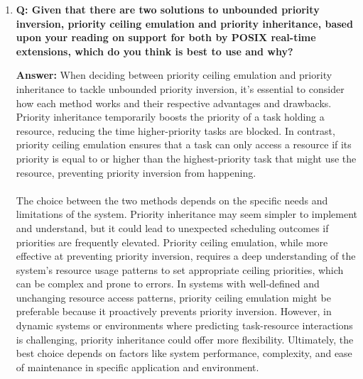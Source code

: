 \documentclass[a4paper,11pt]{article}%
\newenvironment{qanda}{\setlength{\parindent}{0pt}}{\bigskip}
\newcommand{\Q}{\bigskip\bfseries Q: }
\newcommand{\A}{\par\textbf{Answer: } \normalfont}
\begin{document}
\begin{qanda}
\begin{enumerate}
\begin{enumerate}
				\item \Q Given that there are two solutions to unbounded priority inversion, priority ceiling
				      emulation and priority inheritance, based upon your reading on support for both by
				      POSIX real-time extensions, which do you think is best to use and why?
				      \A
				      When deciding between priority ceiling emulation and priority inheritance to tackle unbounded priority inversion, it's essential to consider how each method works and their respective advantages and drawbacks. Priority inheritance temporarily boosts the priority of a task holding a resource, reducing the time higher-priority tasks are blocked. In contrast, priority ceiling emulation ensures that a task can only access a resource if its priority is equal to or higher than the highest-priority task that might use the resource, preventing priority inversion from happening.\\\\
				      The choice between the two methods depends on the specific needs and limitations of the system. Priority inheritance may seem simpler to implement and understand, but it could lead to unexpected scheduling outcomes if priorities are frequently elevated. Priority ceiling emulation, while more effective at preventing priority inversion, requires a deep understanding of the system's resource usage patterns to set appropriate ceiling priorities, which can be complex and prone to errors.
				      In systems with well-defined and unchanging resource access patterns, priority ceiling emulation might be preferable because it proactively prevents priority inversion. However, in dynamic systems or environments where predicting task-resource interactions is challenging, priority inheritance could offer more flexibility. Ultimately, the best choice depends on factors like system performance, complexity, and ease of maintenance in specific application and environment.


			\end{enumerate}

	\end{enumerate}





\end{qanda}
\end{document}
